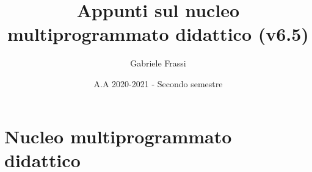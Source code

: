 \documentclass[11pt]{report}
\theoremstyle{definition}
\begin{document}
	\author{Gabriele Frassi}
	\title{Appunti sul nucleo multiprogrammato didattico (v6.5)}
	\date{A.A 2020-2021 - Secondo semestre}
	\maketitle

	

	\tableofcontents
	
	
	

	\part{Nucleo multiprogrammato didattico}
	
	
	
	
	
	
	
	
	
	
	
	
\end{document}
